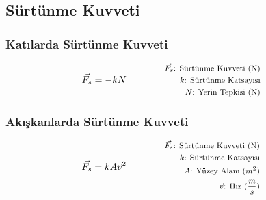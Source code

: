 \subsection{Sürtünme Kuvveti}

\subsubsection*{Katılarda Sürtünme Kuvveti}

\begin{equation}
    \vec{F_s} = -kN \qquad \qquad \parbox{4cm}{\footnotesize$\begin{aligned}
        \vec{F_s}\text{: Sürtünme Kuvveti (N)} \\
        k\text{: Sürtünme Katsayısı} \\
        N\text{: Yerin Tepkisi (N)}
\end{aligned}$}
\end{equation}

\subsubsection*{Akışkanlarda Sürtünme Kuvveti}

\begin{equation}
    \vec{F_s} = k A \vec{v}^2 \qquad \qquad \parbox{4cm}{\footnotesize$\begin{aligned}
        \vec{F_s}\text{: Sürtünme Kuvveti (N)} \\
        k\text{: Sürtünme Katsayısı} \\
        A\text{: Yüzey Alanı } (m^2) \\
        \vec{v}\text{: Hız } (\frac{m}{s})
\end{aligned}$}
\end{equation}
